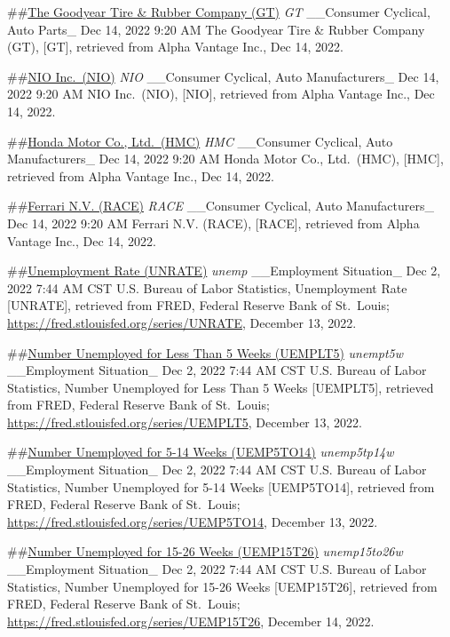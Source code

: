 \documentclass[
]{article}
\begin{document}
\#\#\href{https://finance.yahoo.com/quote/GT}{The Goodyear Tire \&
Rubber Company (GT)} \emph{GT} \_\_Consumer Cyclical, Auto Parts\_ Dec
14, 2022 9:20 AM The Goodyear Tire \& Rubber Company (GT), {[}GT{]},
retrieved from Alpha Vantage Inc., Dec 14, 2022.

\#\#\href{https://finance.yahoo.com/quote/NIO}{NIO Inc.~(NIO)}
\emph{NIO} \_\_Consumer Cyclical, Auto Manufacturers\_ Dec 14, 2022 9:20
AM NIO Inc.~(NIO), {[}NIO{]}, retrieved from Alpha Vantage Inc., Dec 14,
2022.

\#\#\href{https://finance.yahoo.com/quote/HMC}{Honda Motor Co.,
Ltd.~(HMC)} \emph{HMC} \_\_Consumer Cyclical, Auto Manufacturers\_ Dec
14, 2022 9:20 AM Honda Motor Co., Ltd.~(HMC), {[}HMC{]}, retrieved from
Alpha Vantage Inc., Dec 14, 2022.

\#\#\href{https://finance.yahoo.com/quote/RACE}{Ferrari N.V. (RACE)}
\emph{RACE} \_\_Consumer Cyclical, Auto Manufacturers\_ Dec 14, 2022
9:20 AM Ferrari N.V. (RACE), {[}RACE{]}, retrieved from Alpha Vantage
Inc., Dec 14, 2022.

\#\#\href{https://fred.stlouisfed.org/series/UNRATE}{Unemployment Rate
(UNRATE)} \emph{unemp} \_\_Employment Situation\_ Dec 2, 2022 7:44 AM
CST U.S. Bureau of Labor Statistics, Unemployment Rate {[}UNRATE{]},
retrieved from FRED, Federal Reserve Bank of St.~Louis;
\url{https://fred.stlouisfed.org/series/UNRATE}, December 13, 2022.

\#\#\href{https://fred.stlouisfed.org/series/UEMPLT5}{Number Unemployed
for Less Than 5 Weeks (UEMPLT5)} \emph{unempt5w} \_\_Employment
Situation\_ Dec 2, 2022 7:44 AM CST U.S. Bureau of Labor Statistics,
Number Unemployed for Less Than 5 Weeks {[}UEMPLT5{]}, retrieved from
FRED, Federal Reserve Bank of St.~Louis;
\url{https://fred.stlouisfed.org/series/UEMPLT5}, December 13, 2022.

\#\#\href{https://fred.stlouisfed.org/series/UEMP5TO14}{Number
Unemployed for 5-14 Weeks (UEMP5TO14)} \emph{unemp5tp14w} \_\_Employment
Situation\_ Dec 2, 2022 7:44 AM CST U.S. Bureau of Labor Statistics,
Number Unemployed for 5-14 Weeks {[}UEMP5TO14{]}, retrieved from FRED,
Federal Reserve Bank of St.~Louis;
\url{https://fred.stlouisfed.org/series/UEMP5TO14}, December 13, 2022.

\#\#\href{https://fred.stlouisfed.org/series/UEMP15T26}{Number
Unemployed for 15-26 Weeks (UEMP15T26)} \emph{unemp15to26w}
\_\_Employment Situation\_ Dec 2, 2022 7:44 AM CST U.S. Bureau of Labor
Statistics, Number Unemployed for 15-26 Weeks {[}UEMP15T26{]}, retrieved
from FRED, Federal Reserve Bank of St.~Louis;
\url{https://fred.stlouisfed.org/series/UEMP15T26}, December 14, 2022.
\end{document}
